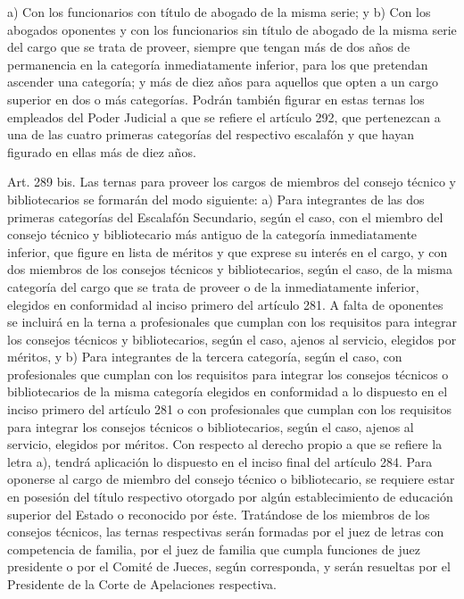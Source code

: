     a) Con los funcionarios con título de abogado de la misma serie; y
    b) Con los abogados oponentes y con los funcionarios sin título de abogado de la misma serie del cargo que se trata de proveer, siempre que tengan más de dos años de permanencia en la categoría inmediatamente inferior, para los que pretendan ascender una categoría; y más de diez años para aquellos que opten a un cargo superior en dos o más categorías. Podrán también figurar en estas ternas los empleados del Poder Judicial a que se refiere el artículo 292, que pertenezcan a una de las cuatro primeras categorías del respectivo escalafón y que hayan figurado en ellas más de diez años.


    Art. 289 bis. Las ternas para proveer los cargos de miembros del consejo técnico y bibliotecarios se formarán del modo siguiente:
    a) Para integrantes de las dos primeras categorías del Escalafón Secundario, según el caso, con el miembro del consejo técnico y bibliotecario más antiguo de la categoría inmediatamente inferior, que figure en lista de méritos y que exprese su interés en el cargo, y con dos miembros de los consejos técnicos y bibliotecarios, según el caso, de la misma categoría del cargo que se trata de proveer o de la inmediatamente inferior, elegidos en conformidad al inciso primero del artículo 281. A falta de oponentes se incluirá en la terna a profesionales que cumplan con los requisitos para integrar los consejos técnicos y bibliotecarios, según el caso, ajenos al servicio, elegidos por méritos, y
    b) Para integrantes de la tercera categoría, según el caso, con profesionales que cumplan con los requisitos para integrar los consejos técnicos o bibliotecarios de la misma categoría elegidos en conformidad a lo dispuesto en el inciso primero del artículo 281 o con profesionales que cumplan con los requisitos para integrar los consejos técnicos o bibliotecarios, según el caso, ajenos al servicio, elegidos por méritos.
    Con respecto al derecho propio a que se refiere la letra a), tendrá aplicación lo dispuesto en el inciso final del artículo 284.
    Para oponerse al cargo de miembro del consejo técnico o bibliotecario, se requiere estar en posesión del título respectivo otorgado por algún establecimiento de educación superior del Estado o reconocido por éste.
    Tratándose de los miembros de los consejos técnicos, las ternas respectivas serán formadas por el juez de letras con competencia de familia, por el juez de familia que cumpla funciones de juez presidente o por el Comité de Jueces, según corresponda, y serán resueltas por el Presidente de la Corte de Apelaciones respectiva.


